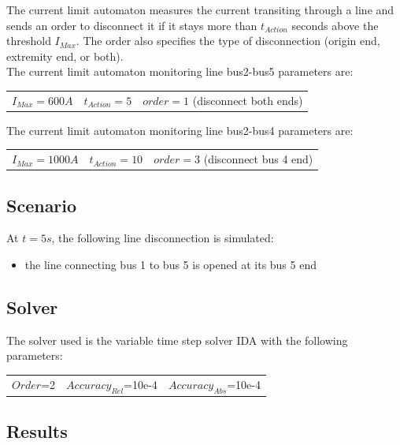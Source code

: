\documentclass[a4paper, 12pt]{report}
\begin{document}
The current limit automaton measures the current transiting through a line and sends an order to disconnect it if it stays more than $t_{Action}$ seconds above the threshold $I_{Max}$. The order also specifies the type of disconnection (origin end, extremity end, or both).\\

The current limit automaton monitoring line bus2-bus5 parameters are:
\begin{center}
\begin{tabular}{l|l|l}
   $I_{Max}=600A$ & $t_{Action}=5$ & $order=1$ (disconnect both ends)\\
\end{tabular}
\end{center}

The current limit automaton monitoring line bus2-bus4 parameters are:
\begin{center}
\begin{tabular}{l|l|l}
   $I_{Max}=1000A$ & $t_{Action}=10$ & $order=3$ (disconnect bus 4 end)\\
\end{tabular}
\end{center}

\subsection{Scenario}
At $t=5s$, the following line disconnection is simulated:
\begin{itemize}
\item{the line connecting bus 1 to bus 5 is opened at its bus 5 end}
\end{itemize}

\subsection{Solver}
The solver used is the variable time step solver IDA with the following parameters:
\begin{center}
\begin{tabular}{l|l|l}
   $Order$=2 & $Accuracy_{Rel}$=10e-4 & $Accuracy_{Abs}$=10e-4 \\
\end{tabular}
\end{center}


\newpage
\subsection{Results}
\end{document}
